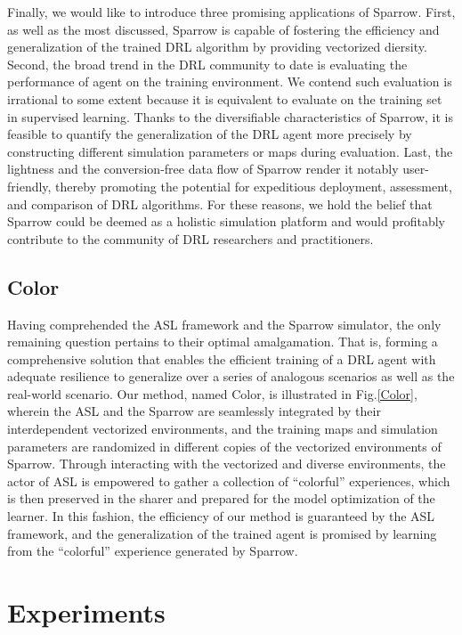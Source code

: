 \documentclass[journal]{IEEEtran}
\begin{document}
Finally, we would like to introduce three promising applications of Sparrow. First, as well as the most discussed, Sparrow is capable of fostering the efficiency and generalization of the trained DRL algorithm by providing vectorized diersity. Second, the broad trend in the DRL community to date is evaluating the performance of agent on the training environment. We contend such evaluation is irrational to some extent because it is equivalent to evaluate on the training set in supervised learning. Thanks to the diversifiable characteristics of Sparrow, it is feasible to quantify the generalization of the DRL agent more precisely by constructing different simulation parameters or maps during evaluation. Last, the lightness and the conversion-free data flow of Sparrow render it notably user-friendly, thereby promoting the potential for expeditious deployment, assessment, and comparison of DRL algorithms. For these reasons, we hold the belief that Sparrow could be deemed as a holistic simulation platform and would profitably contribute to the community of DRL researchers and practitioners.


\subsection{Color}

Having comprehended the ASL framework and the Sparrow simulator, the only remaining question pertains to their optimal amalgamation. That is, forming a comprehensive solution that enables the efficient training of a DRL agent with adequate resilience to generalize over a series of analogous scenarios as well as the real-world scenario. Our method, named Color, is illustrated in Fig.\ref{Color}, wherein the ASL and the Sparrow are seamlessly integrated by their interdependent vectorized environments, and the training maps and simulation parameters are randomized in different copies of the vectorized environments of Sparrow. Through interacting with the vectorized and diverse environments, the actor of ASL is empowered to gather a collection of “colorful” experiences, which is then preserved in the sharer and prepared for the model optimization of the learner. In this fashion, the efficiency of our method is guaranteed by the ASL framework, and the generalization of the trained agent is promised by learning from the “colorful” experience generated by Sparrow. 

\section{Experiments}
\label{section4}
\end{document}
